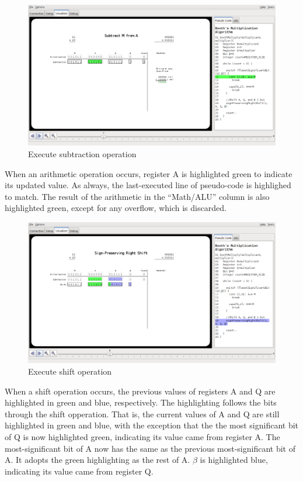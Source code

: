 \documentclass{article}
\begin{document}
\begin{figure}[h]
\centering
\includegraphics[scale=0.3]{sub.pdf}
\caption{Execute subtraction operation}
\end{figure}

When an arithmetic operation occurs, register A is highlighted green to indicate its updated value.
As always, the last-executed line of pseudo-code is highlighed to match.
The result of the arithmetic in the ``Math/ALU'' column is also highlighted green, except for any overflow, which is discarded.

\pagebreak
\begin{figure}[h]
\centering
\includegraphics[scale=0.3]{shift.pdf}
\caption{Execute shift operation}
\end{figure}

When a shift operation occurs, the previous values of registers A and Q are highlighted in green and blue, respectively.
The highlighting follows the bits through the shift opperation.
That is, the current values of A and Q are still highlighted in green and blue, with the exception that the the most significant bit of Q is now highlighted green, indicating its value came from register A.
The most-significant bit of A now has the same as the previous most-significant bit of A.
It adopts the green highlighting as the rest of A.%
$\beta$ is highlighted blue, indicating its value came from register Q.
\end{document}
